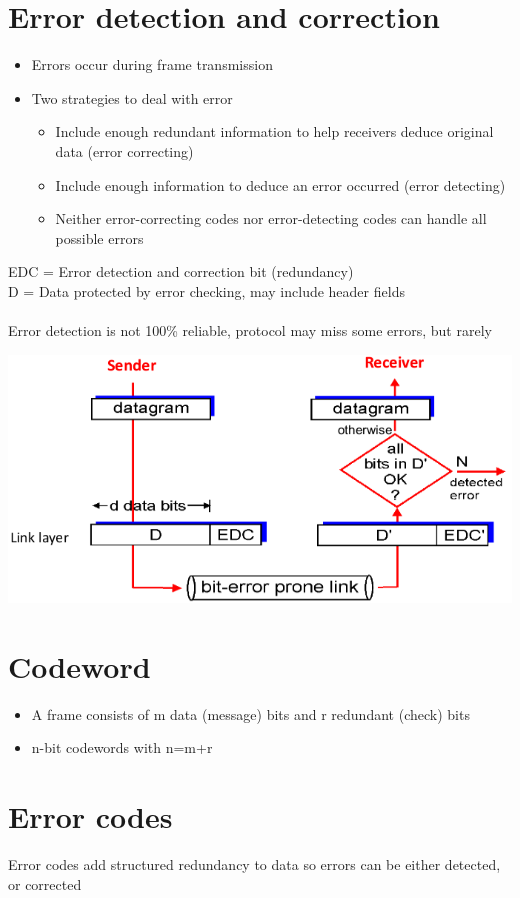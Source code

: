 \documentclass{article}[18pt]
\begin{document}
\section{Error detection and correction}
\begin{itemize}
	\item Errors occur during frame transmission
	\item Two strategies to deal with error
	\begin{itemize}
		\item Include enough redundant information to help receivers deduce original data (error correcting)
		\item Include enough information to deduce an error occurred (error detecting)
		\item Neither error-correcting codes nor error-detecting codes can handle all possible errors
	\end{itemize}
\end{itemize}
EDC = Error detection and correction bit (redundancy)\\
D = Data protected by error checking, may include header fields\\
\\
Error detection is not 100\% reliable, protocol may miss some errors, but rarely
\begin{center}
	\includegraphics[scale=0.7]{EDC}
\end{center}
\section{Codeword}
\begin{itemize}
	\item A frame consists of m data (message) bits and r redundant (check) bits
	\item n-bit codewords with n=m+r
\end{itemize}
\section{Error codes}
Error codes add structured redundancy to data so errors can be either detected, or corrected
\end{document}
